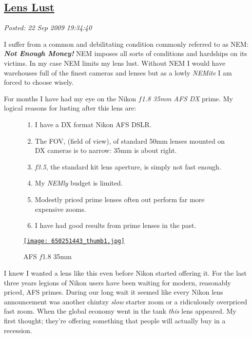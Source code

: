 %

\subsection*{\href{https://bakerjd99.wordpress.com/2009/09/22/lens-lust/}{Lens Lust}}


\noindent\emph{Posted: 22 Sep 2009 19:34:40}
\vspace{6pt}

I suffer from a common and debilitating condition commonly referred to
as NEM: \emph{\textbf{Not Enough Money!}} NEM imposes all sorts of
conditions and hardships on its victims. In my case NEM limits my lens
lust. Without NEM I would have warehouses full of the finest cameras and
lenses but as a lowly \emph{NEMite} I am forced to choose wisely.

For months I have had my eye on the Nikon \emph{$f$1.8 35mm AFS DX} prime.
My logical reasons for lusting after this lens are:

\captionsetup[figure]{labelformat=empty}
\begin{figure}[ht]
\begin{minipage}[b]{0.65\textwidth}
\begin{enumerate}
\item
  I have a DX format Nikon AFS DSLR.
\item
  The FOV, (field of view), of standard 50mm lenses mounted on DX
  cameras is to narrow: 35mm is about right.
\item
  \emph{f3.5}, the standard kit lens aperture, is simply not fast
  enough.
\item
  My \emph{NEMly} budget is limited.
\item
  Modestly priced prime lenses often out perform far more expensive
  zooms.
\item
  I have had good results from prime lenses in the past.
\end{enumerate}
\end{minipage}
\hspace{1pt}
\begin{minipage}[b]{0.32\textwidth}
\centering
\href{http://bakerjd99.files.wordpress.com/2009/09/6502514431.jpg}{\texttt{[image: 650251443\_thumb1.jpg]}}
\caption{AFS $f$1.8 35mm}
\label{fig:88X0}
\end{minipage}
\end{figure}

I knew I wanted a lens like this even before Nikon started offering it.
For the last three years legions of Nikon users have been waiting for
modern, reasonably priced, AFS primes. During our long wait it seemed
like every Nikon lens announcement was another chintzy
\emph{slow} starter zoom or a ridiculously overpriced fast zoom. When the
global economy went in the tank \emph{this} lens appeared. My first
thought; they're offering something that people will actually buy in a
recession.

